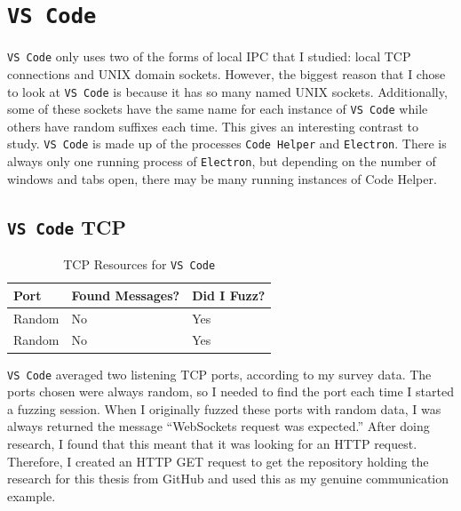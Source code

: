 \section{\texttt{VS Code}}
\label{sec:code}
\texttt{VS Code} only uses two of the forms of local IPC that I studied: local TCP connections and UNIX domain sockets.  However, the biggest reason that I chose to look at \texttt{VS Code} is because it has so many named UNIX sockets.  Additionally, some of these sockets have the same name for each instance of \texttt{VS Code} while others have random suffixes each time.  This gives an interesting contrast to study.  \texttt{VS Code} is made up of the processes \texttt{Code Helper} and \texttt{Electron}.  There is always only one running process of \texttt{Electron}, but depending on the number of windows and tabs open, there may be many running instances of Code Helper.

\subsection{\texttt{VS Code} TCP}
\label{sec:codeTcp}

\begin{table}
\centering
\begin{normalsize}
\begin{tabular}{ l | l | l }
\textbf{Port} & \textbf{Found Messages?} & \textbf{Did I Fuzz?} \\ \hline
Random & No & Yes \\ \hline
Random & No & Yes \\ \hline
\end{tabular}
\caption{TCP Resources for \texttt{VS Code}}
\label{tab:vsCodeTcp}
\end{normalsize}
\end{table}

\texttt{VS Code} averaged two listening TCP ports, according to my survey data.  The ports chosen were always random, so I needed to find the port each time I started a fuzzing session.  When I originally fuzzed these ports with random data, I was always returned the message ``WebSockets request was expected.''  After doing research, I found that this meant that it was looking for an HTTP request.  Therefore, I created an HTTP GET request to get the repository holding the research for this thesis from GitHub and used this as my genuine communication example.

